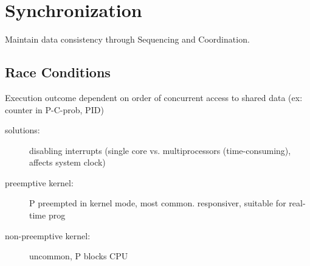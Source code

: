 \section*{Synchronization}
Maintain data consistency through Sequencing and Coordination.
\subsection*{Race Conditions}
Execution outcome dependent on order of concurrent access to shared data (ex: counter in P-C-prob, PID)
\begin{description}
        \item[solutions:] disabling interrupts (single core vs. multiprocessors (time-consuming), affects system clock)
        \item[preemptive kernel:] P preempted in kernel mode, most common. responsiver, suitable for real-time prog %
        \item [non-preemptive kernel:] uncommon, P blocks CPU
\end{description}

